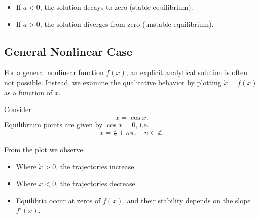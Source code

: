 \begin{itemize}
    \item If $a < 0$, the solution decays to zero (stable equilibrium).
    \item If $a > 0$, the solution diverges from zero (unstable equilibrium).
\end{itemize}

\subsection{General Nonlinear Case}
For a general nonlinear function $f(x)$, an explicit analytical solution is often not possible.  
Instead, we examine the qualitative behavior by plotting $\dot{x} = f(x)$ as a function of $x$.  

\begin{example}
Consider
\begin{equation}
    \dot{x} = \cos x.
\end{equation}
Equilibrium points are given by $\cos x = 0$, i.e.
\[
x = \tfrac{\pi}{2} + n\pi, \quad n \in \mathbb{Z}.
\]
\end{example}

\begin{center}
\end{center}

From the plot we observe:
\begin{itemize}
    \item Where $\dot{x} > 0$, the trajectories increase.
    \item Where $\dot{x} < 0$, the trajectories decrease.
    \item Equilibria occur at zeros of $f(x)$, and their stability depends on the slope $f'(x)$.
\end{itemize}

